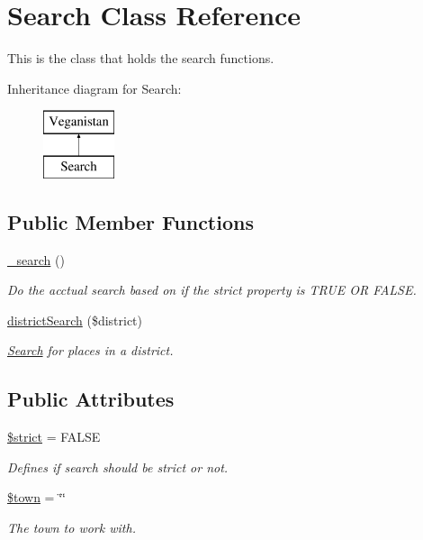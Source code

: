 \hypertarget{class_search}{}\section{Search Class Reference}
\label{class_search}


This is the class that holds the search functions.  


Inheritance diagram for Search\+:\begin{figure}[H]
\begin{center}
\leavevmode
\includegraphics[height=2.000000cm]{class_search}
\end{center}
\end{figure}
\subsection*{Public Member Functions}
\begin{DoxyCompactItemize}
\item 
\hyperlink{class_search_a80725b6a32dfc685558764d47002d9c0}{\+\_\+search} ()
\begin{DoxyCompactList}\small\item\em Do the acctual search based on if the strict property is T\+R\+UE OR F\+A\+L\+SE. \end{DoxyCompactList}\item 
\hyperlink{class_search_abed37f92ad0062d99e00965ee0c9d02e}{district\+Search} (\$district)
\begin{DoxyCompactList}\small\item\em \hyperlink{class_search}{Search} for places in a district. \end{DoxyCompactList}\end{DoxyCompactItemize}
\subsection*{Public Attributes}
\begin{DoxyCompactItemize}
\item 
\hyperlink{class_search_ad5a555c9913e06e21914adb4d9fc36d6}{\$strict} = F\+A\+L\+SE
\begin{DoxyCompactList}\small\item\em Defines if search should be strict or not. \end{DoxyCompactList}\item 
\hyperlink{class_search_aab54895afb81d800b1aa7b5ed1e316d2}{\$town} = \char`\"{}\char`\"{}
\begin{DoxyCompactList}\small\item\em The town to work with. \end{DoxyCompactList}\end{DoxyCompactItemize}

